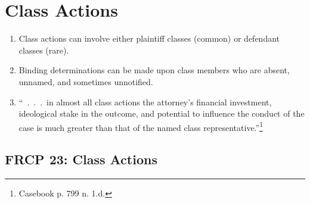\section{Class Actions}

\begin{enumerate}
    \item Class actions can involve either plaintiff classes (common) or
    defendant classes (rare).
    \item Binding determinations can be made upon class members who are
    absent, unnamed, and sometimes unnotified.
    \item ``~.~.~.~in almost all class actions the attorney's financial
    investment, ideological stake in the outcome, and potential to influence
    the conduct of the case is much greater than that of the named class
    representative.''\footnote{Casebook p. 799 n. 1.d.}
\end{enumerate}

\subsection{FRCP 23: Class Actions}

